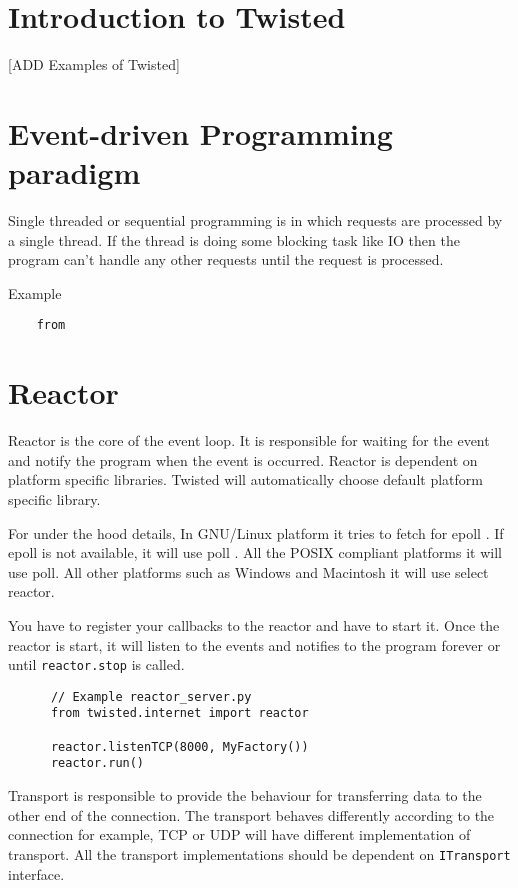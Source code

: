\documentclass{article}
\begin{document}
  \section{Introduction to Twisted}
    [ADD Examples of Twisted]
  \section{Event-driven Programming paradigm}
  Single threaded or sequential programming is in which requests are processed
  by a single thread. If the thread is doing some blocking task like IO then
  the program can't handle any other requests until the request is processed.

  Example
  \begin{verbatim}
    from 
  \end{verbatim}

  \section{Reactor}
    Reactor is the core of the event loop. It is responsible for waiting for
    the event and notify the program when the event is occurred. Reactor is
    dependent on platform specific libraries. Twisted will automatically choose
    default platform specific library.

    For under the hood details, In GNU/Linux platform it tries to fetch for
    epoll \cite{epoll}.  If epoll \cite{epoll} is not available, it will use
    poll \cite{poll}. All the POSIX compliant platforms it will use poll. All
    other platforms such as Windows and Macintosh it will use select reactor.

    You have to register your callbacks to the reactor and have to start it.
    Once the reactor is start, it will listen to the events and notifies to the
    program forever or until \texttt{reactor.stop} is called.

    \begin{verbatim}
      // Example reactor_server.py
      from twisted.internet import reactor

      reactor.listenTCP(8000, MyFactory())
      reactor.run()
    \end{verbatim}


    Transport is responsible to provide the behaviour for transferring data to
    the other end of the connection. The transport behaves differently
    according to the connection for example, TCP or UDP will have different
    implementation of transport. All the transport implementations should be
    dependent on \texttt{ITransport} interface.
\end{document}
